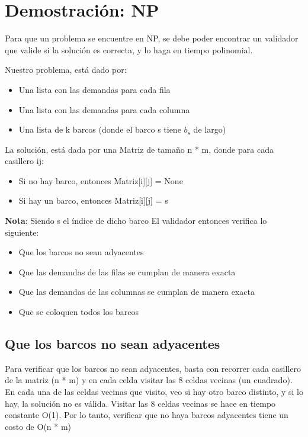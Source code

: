 \section{Demostración: NP}

Para que un problema se encuentre en NP, se debe poder encontrar un validador que valide si la solución es correcta, y lo haga en tiempo polinomial.

\vskip0.25cm

Nuestro problema, está dado por:

\begin{itemize}
    \item Una lista con las demandas para cada fila
    \item Una lista con las demandas para cada columna
    \item Una lista de k barcos (donde el barco s tiene $b_{s}$ de largo)
\end{itemize}

La solución, está dada por una Matriz de tamaño n * m, donde para cada casillero ij:

\begin{itemize}
    \item Si no hay barco, entonces Matriz[i][j] = None
    \item Si hay un barco, entonces Matriz[i][j] = s
\end{itemize}

\textbf{Nota}: Siendo s el índice de dicho barco
\vskip0.25cm
El validador entonces verifica lo siguiente:

\begin{itemize}
    \item Que los barcos no sean adyacentes
    \item Que las demandas de las filas se cumplan de manera exacta
    \item Que las demandas de las columnas se cumplan de manera exacta
    \item Que se coloquen todos los barcos
\end{itemize}

\subsection{Que los barcos no sean adyacentes}

    Para verificar que los barcos no sean adyacentes, basta con recorrer cada casillero de la matriz (n * m) y en cada celda visitar las 8 celdas vecinas (un cuadrado).
    En cada una de las celdas vecinas que visito, veo si hay otro barco distinto, y si lo hay, la solución no es válida.
    Visitar las 8 celdas vecinas se hace en tiempo constante O(1). Por lo tanto, verificar que no haya barcos adyacentes tiene un costo de O(n * m)


